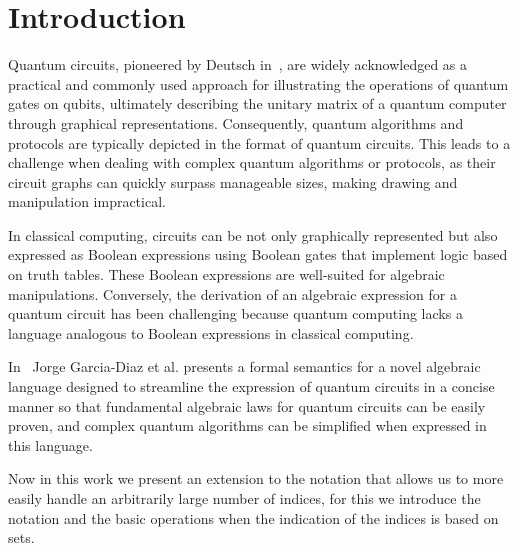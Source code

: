 \section{Introduction}

Quantum circuits, pioneered by Deutsch in~\cite{Deutsch1989}, are widely acknowledged as a practical and commonly used approach for illustrating the operations of quantum gates on qubits, ultimately describing the unitary matrix of a quantum computer through graphical representations.
Consequently, quantum algorithms and protocols are typically depicted in the format of quantum circuits.
This leads to a challenge when dealing with complex quantum algorithms or protocols, as their circuit graphs can quickly surpass manageable sizes, making drawing and manipulation impractical.

In classical computing, circuits can be not only graphically represented but also expressed as Boolean expressions using Boolean gates that implement logic based on truth tables.
These Boolean expressions are well-suited for algebraic manipulations.
Conversely, the derivation of an algebraic expression for a quantum circuit has been challenging because quantum computing lacks a language analogous to Boolean expressions in classical computing.

In~\cite{reina2024ix} Jorge Garcia-Diaz et al. presents a formal semantics for a novel algebraic language designed to
streamline the expression of quantum circuits in a concise manner so that fundamental algebraic laws for quantum circuits can be easily proven, and complex quantum algorithms can be simplified when expressed in this language.

Now in this work we present an extension to the notation that allows us to more easily handle an arbitrarily large number of indices, for this we introduce the notation and the basic operations when the indication of the indices is based on sets.